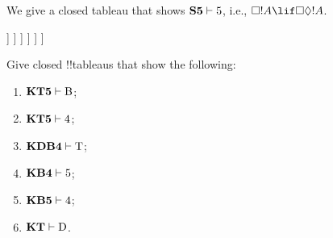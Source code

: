 \documentclass[../../../include/open-logic-section]{subfiles}
\begin{document}


\begin{ex}
  We give a closed tableau that shows $\Log{S5} \Proves \Ax{5}$, i.e.,
  $\Box!A \lif \Box\Diamond!A$.
  \begin{oltableau}
    [\pFmla{\False}{\Box\formula{A} \lif \Box\Diamond \formula{A}}{1},
      just = \TAss
      [\pFmla{\True}{\Box \formula{A}}{1}, just = {\TRule{\False}{\lif}[1]}
        [\pFmla{\False}{\Box\Diamond \formula{A}}{1},
          just = {\TRule{\False}{\lif}[1]}
          [\pFmla{\False}{\Diamond \formula{A}}{1.1},
            just = {\TRule{\False}{\Box}[3]}
            [\pFmla{\False}{\Diamond \formula{A}}{1},
              just = {4r$\Diamond$ 4}
              [\pFmla{\False}{\formula{A}}{1.1},
                just = {\TRule{\False}{\Diamond}[5]}
                [\pFmla{\True}{\formula{A}}{1.1},
                  just = {\TRule{\True}{\Box}[2]}, close]
              ]
            ]
          ]
        ]
      ]
    ]
  \end{oltableau}
\end{ex}

\begin{prob}
Give closed !!{tableau}s that show the following:
  \begin{enumerate}
  \item $\Log{KT5} \Proves \Ax{B}$;
  \item $\Log{KT5} \Proves \Ax{4}$;
  \item $\Log{KDB4} \Proves \Ax{T}$;
  \item $\Log{KB4} \Proves \Ax{5}$;
  \item $\Log{KB5} \Proves \Ax{4}$;
  \item $\Log{KT} \Proves \Ax{D}$.
  \end{enumerate}
\end{prob}
\end{document}
